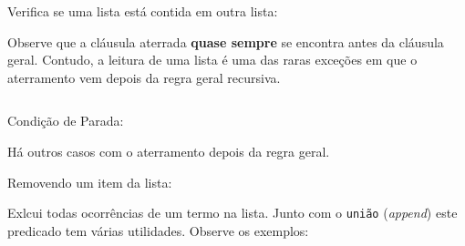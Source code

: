 \documentclass[sans]{beamer}
\begin{document}

\begin{frame}
\begin{block}{Verifica se uma lista está contida em outra lista:}

  Observe que  a cláusula aterrada {\bf quase sempre} se encontra antes da cláusula geral. 
 Contudo, a leitura de uma lista é uma das raras exceções em que o aterramento vem depois da regra geral recursiva.
    
{\scriptsize
\inputminted{Prolog}{prolog/lista17.txt}
}


\end{block}
\end{frame}


\begin{frame}
\begin{block}{Condição de Parada:}




Há outros casos com o aterramento depois da regra geral.
    

\end{block}
\end{frame}


\begin{frame}
\begin{block}{Removendo um item da lista:}


Exlcui todas
ocorrências de um termo na lista. Junto com o {\tt união} 
({\em append}) este predicado tem várias utilidades. Observe
os exemplos:
   
{\scriptsize
\inputminted{Prolog}{prolog/RemovendoItem.txt}
}
 

\end{block}
\end{frame}
\end{document}
